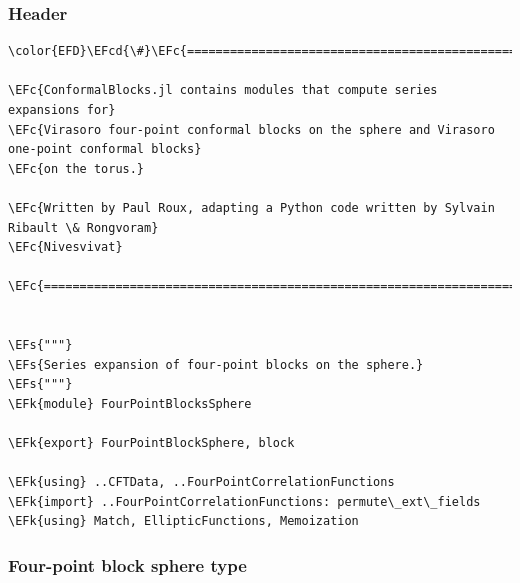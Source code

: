 \documentclass[a4paper]{article}
\numberwithin{equation}{section}
\newcommand{\EFc}[1]{\textcolor{EFc}{#1}} %
\newcommand{\EFcd}[1]{\textcolor{EFcd}{#1}} %
\newcommand{\EFs}[1]{\textcolor{EFs}{#1}} %
\newcommand{\EFk}[1]{\textcolor{EFk}{#1}} %
\begin{document}
\subsubsection*{Header}
\label{sec:orge4df249}

\begin{Code}
\begin{Verbatim}
\color{EFD}\EFcd{\#}\EFc{===========================================================================================}

\EFc{ConformalBlocks.jl contains modules that compute series expansions for}
\EFc{Virasoro four-point conformal blocks on the sphere and Virasoro one-point conformal blocks}
\EFc{on the torus.}

\EFc{Written by Paul Roux, adapting a Python code written by Sylvain Ribault \& Rongvoram}
\EFc{Nivesvivat}

\EFc{===========================================================================================\#}


\EFs{"""}
\EFs{Series expansion of four-point blocks on the sphere.}
\EFs{"""}
\EFk{module} FourPointBlocksSphere

\EFk{export} FourPointBlockSphere, block

\EFk{using} ..CFTData, ..FourPointCorrelationFunctions
\EFk{import} ..FourPointCorrelationFunctions: permute\_ext\_fields
\EFk{using} Match, EllipticFunctions, Memoization

\end{Verbatim}
\end{Code}
\subsubsection*{Four-point block sphere type}
\label{sec:orgddfb13b}
\end{document}
